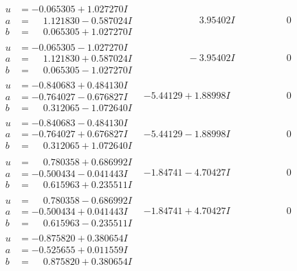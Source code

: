 \documentclass[1p]{elsarticle_modified}
\theoremstyle{definition}
\begin{document}
$$\begin{array}{c|c|c}
\begin{aligned}
u &= -0.065305 + 1.027270 I \\
a &= \phantom{-}1.121830 - 0.587024 I \\
b &= \phantom{-}0.065305 + 1.027270 I\end{aligned}
 & \phantom{-0.000000 -}3.95402 I & \phantom{-0.000000 } 0 \\ \hline\begin{aligned}
u &= -0.065305 - 1.027270 I \\
a &= \phantom{-}1.121830 + 0.587024 I \\
b &= \phantom{-}0.065305 - 1.027270 I\end{aligned}
 & \phantom{-0.000000 } -3.95402 I & \phantom{-0.000000 } 0 \\ \hline\begin{aligned}
u &= -0.840683 + 0.484130 I \\
a &= -0.764027 - 0.676827 I \\
b &= \phantom{-}0.312065 - 1.072640 I\end{aligned}
 & -5.44129 + 1.88998 I & \phantom{-0.000000 } 0 \\ \hline\begin{aligned}
u &= -0.840683 - 0.484130 I \\
a &= -0.764027 + 0.676827 I \\
b &= \phantom{-}0.312065 + 1.072640 I\end{aligned}
 & -5.44129 - 1.88998 I & \phantom{-0.000000 } 0 \\ \hline\begin{aligned}
u &= \phantom{-}0.780358 + 0.686992 I \\
a &= -0.500434 - 0.041443 I \\
b &= \phantom{-}0.615963 + 0.235511 I\end{aligned}
 & -1.84741 - 4.70427 I & \phantom{-0.000000 } 0 \\ \hline\begin{aligned}
u &= \phantom{-}0.780358 - 0.686992 I \\
a &= -0.500434 + 0.041443 I \\
b &= \phantom{-}0.615963 - 0.235511 I\end{aligned}
 & -1.84741 + 4.70427 I & \phantom{-0.000000 } 0 \\ \hline\begin{aligned}
u &= -0.875820 + 0.380654 I \\
a &= -0.525655 + 0.011559 I \\
b &= \phantom{-}0.875820 + 0.380654 I\end{aligned}

\end{array}$$
\end{document}
